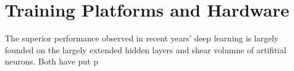 \section{Training Platforms and Hardware}
The superior performance observed in recent years' deep learning is largely founded on the largely extended hidden layers and shear volumne of artifitial neurons. Both have put p